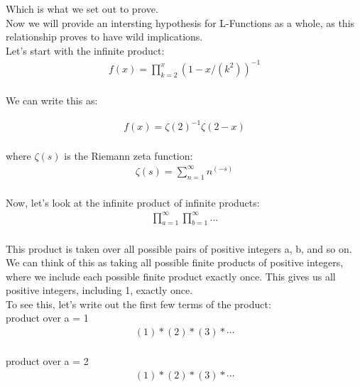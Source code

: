 \documentclass{article}
\begin{document}
Which is what we set out to prove. \\

Now we will provide an intersting hypothesis for L-Functions as a whole, as this relationship proves to have wild implications. \\

Let's start with the infinite product: \\

\begin{align*}
f(x) = \prod_{k=2}^x \left(1 - x/ \left(k^2\right)\right)^{-1} \\
\end{align*}

We can write this as:

\begin{align*}
f(x) = {\zeta\left(2\right)^{-1}}{\zeta\left(2-x\right)} \\
\end{align*}

where $\zeta(s)$ is the Riemann zeta function: \\

\begin{align*}
\zeta(s) = \sum_{n=1}^\infty n^\left(-s\right) \\
\end{align*}

Now, let's look at the infinite product of infinite products: \\

\begin{align*}
\prod_{a=1}^\infty \prod_{b=1}^\infty ... \\
\end{align*}

This product is taken over all possible pairs of positive integers a, b, and so on. We can think of this as taking all possible finite products of positive integers, where we include each possible finite product exactly once. This gives us all positive integers, including 1, exactly once. \\

To see this, let's write out the first few terms of the product: \\

product over a = 1 
\begin{align*}
(1) * (2) * (3) * \cdots \\
\end{align*}

product over a = 2
\begin{align*}
(1) * (2) * (3) * \cdots \\
\end{align*}
\end{document}
